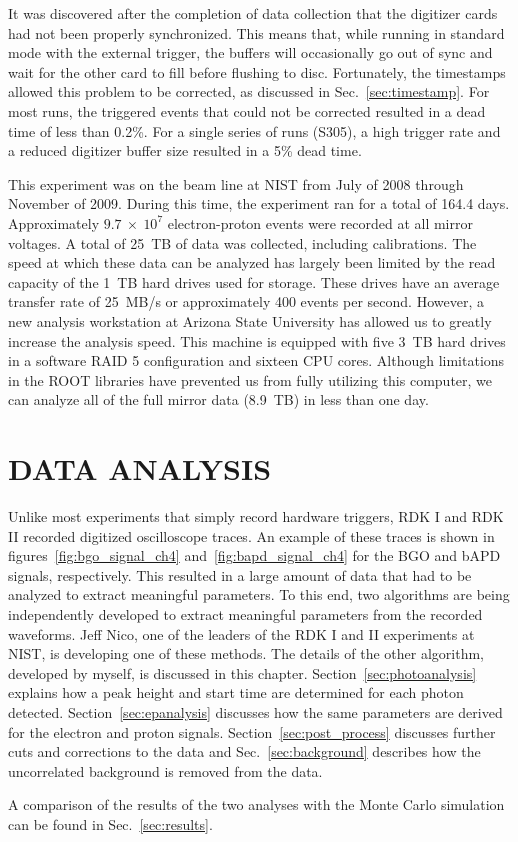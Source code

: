 \documentclass[oneside,12pt]{memoir}
\begin{document}
It was discovered after the completion of data collection that the digitizer cards had not been properly synchronized. This means that, while running in standard mode with the external trigger, the buffers will occasionally go out of sync and wait for the other card to fill before flushing to disc. Fortunately, the timestamps allowed this problem to be corrected, as discussed in Sec.~\ref{sec:timestamp}. For most runs, the triggered events that could not be corrected resulted in a dead time of less than 0.2\%. For a single series of runs (S305), a high trigger rate and a reduced digitizer buffer size resulted in a 5\% dead time.\par
This experiment was on the beam line at NIST from July of 2008 through November of 2009. During this time, the experiment ran for a total of 164.4 days. Approximately $9.7~\times ~10^7$ electron-proton events were recorded at all mirror voltages. A total of 25~TB of data was collected, including calibrations. The speed at which these data can be analyzed has largely been limited by the read capacity of the 1~TB hard drives used for storage. These drives have an average transfer rate of 25~MB/s or approximately 400 events per second. However, a new analysis workstation at Arizona State University has allowed us to greatly increase the analysis speed. This machine is equipped with five 3~TB hard drives in a software RAID 5 configuration and sixteen CPU cores. Although limitations in the ROOT libraries have prevented us from fully utilizing this computer, we can analyze all of the full mirror data (8.9~TB) in less than one day.

\chapter{DATA ANALYSIS}
\label{ch:analysis}
Unlike most experiments that simply record hardware triggers, RDK I and RDK II recorded digitized oscilloscope traces. An example of these traces is shown in figures~\ref{fig:bgo_signal_ch4} and~\ref{fig:bapd_signal_ch4} for the BGO and bAPD signals, respectively. This resulted in a large amount of data that had to be analyzed to extract meaningful parameters. To this end, two algorithms are being independently developed to extract meaningful parameters from the recorded waveforms. Jeff Nico, one of the leaders of the RDK I and II experiments at NIST, is developing one of these methods. The details of the other algorithm, developed by myself, is discussed in this chapter. Section~\ref{sec:photoanalysis} explains how a peak height and start time are determined for each photon detected. Section~\ref{sec:epanalysis} discusses how the same parameters are derived for the electron and proton signals. Section~\ref{sec:post_process} discusses further cuts and corrections to the data and Sec.~\ref{sec:background} describes how the uncorrelated background is removed from the data.\par
A comparison of the results of the two analyses with the Monte Carlo simulation can be found in Sec.~\ref{sec:results}.
\end{document}
